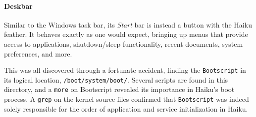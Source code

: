 \documentclass{article}
\begin{document}
\paragraph{Deskbar}
Similar to the Windows task bar, its \textit{Start} bar is instead a button with the Haiku feather. It behaves exactly as one would expect, bringing up menus that provide access to applications, shutdown/sleep functionality, recent documents, system preferences, and more.\cite{Deskbar}

This was all discovered through a fortunate accident, finding the \texttt{Bootscript} in its logical location, \texttt{/boot/system/boot/}. Several scripts are found in this directory, and a \texttt{more} on Bootscript revealed its importance in Haiku's boot process. A \texttt{grep} on the kernel source files confirmed that \texttt{Bootscript} was indeed solely responsible for the order of application and service initialization in Haiku.

{}

\end{document}
